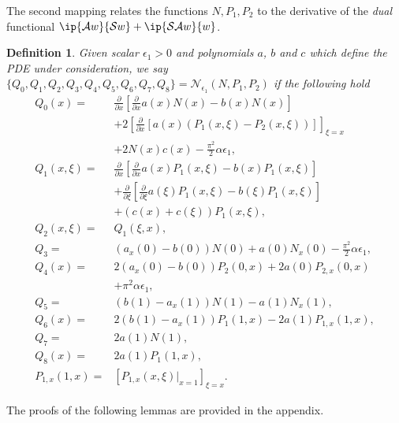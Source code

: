 \documentclass[US letter, 9 pt, conference]{ieeeconf}  \usepackage{setspace}
\newtheorem{definition}{Definition}
\newcommand{\pfx}{\frac{\partial}{\partial x}}
\newcommand{\pfxi}{\frac{\partial}{\partial \xi}}
\newcommand{\mcl}[1]{\mathcal{#1}}
\newcommand{\sop}{\mathcal{S}}
\begin{document}
The second mapping relates the functions $N,P_1,P_2$ to the derivative of the \textit{dual} functional $\ip{\mcl{A}w}{\sop w}+\ip{\mcl{SA}w}{w}$.
\begin{definition}\label{def:primal}
Given scalar $\epsilon_1>0$ and polynomials $a$, $b$ and $c$ which define the PDE under consideration, we say $\{Q_0,Q_1,Q_2,Q_3,Q_4,Q_5,Q_6,Q_7,Q_8\}=\mcl{N}_{\epsilon_1}\left(N,P_1,P_2\right)$ if the following hold
\begin{align*}
Q_0(x)=& \pfx \left[\pfx a(x)N(x)-b(x)N(x) \right]\\
&+ 2\left[\pfx \left[a(x)\left(P_1(x,\xi)-P_2(x,\xi) \right) \right] \right]_{\xi=x}\\
&+2N(x)c(x)-\frac{\pi^2}{2}\alpha \epsilon_1,\\
Q_1(x,\xi)=&\pfx \left[\pfx a(x)P_1(x,\xi)-b(x)P_1(x,\xi) \right] \\
&+\pfxi \left[\pfxi a(\xi)P_1(x,\xi)-b(\xi)P_1(x,\xi) \right]\\
&+\left(c(x)+c(\xi) \right)P_1(x,\xi),\\
Q_2(x,\xi)=&Q_1(\xi,x),\\
Q_3=& \left(a_x(0)-b(0) \right)N(0)+a(0)N_x(0)-\frac{\pi^2}{2}\alpha \epsilon_1,\\
Q_4(x)=& 2\left(a_x(0)-b(0)\right)P_2(0,x)+2a(0)P_{2,x}(0,x)\\
&+\pi^2 \alpha \epsilon_1,\\
Q_5=&(b(1)-a_x(1))N(1)-a(1)N_x(1),\\
Q_6(x)=&2(b(1)-a_x(1))P_1(1,x)-2a(1)P_{1,x}(1,x),\\
Q_7=&2a(1)N(1),\\
Q_8(x)=&2a(1)P_1(1,x),\\
P_{1,x}(1,x)=& \left[P_{1,x}(x,\xi)|_{x=1} \right]_{\xi=x}.
\end{align*}
\end{definition}

The proofs of the following lemmas are provided in the appendix.
\end{document}
